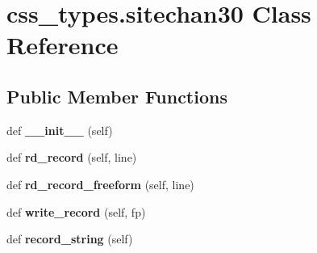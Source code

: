 \hypertarget{classcss__types_1_1sitechan30}{}\section{css\+\_\+types.\+sitechan30 Class Reference}
\label{classcss__types_1_1sitechan30}
\subsection*{Public Member Functions}
\begin{DoxyCompactItemize}
\item 
\hypertarget{classcss__types_1_1sitechan30_a282a0584cb243799c2d35a0ad6472b5b}{}def {\bfseries \+\_\+\+\_\+init\+\_\+\+\_\+} (self)\label{classcss__types_1_1sitechan30_a282a0584cb243799c2d35a0ad6472b5b}

\item 
\hypertarget{classcss__types_1_1sitechan30_abcb97cf4033ae1c433e7524b8701e3ac}{}def {\bfseries rd\+\_\+record} (self, line)\label{classcss__types_1_1sitechan30_abcb97cf4033ae1c433e7524b8701e3ac}

\item 
\hypertarget{classcss__types_1_1sitechan30_aabfcf51ff3c5c79edbe84471622db853}{}def {\bfseries rd\+\_\+record\+\_\+freeform} (self, line)\label{classcss__types_1_1sitechan30_aabfcf51ff3c5c79edbe84471622db853}

\item 
\hypertarget{classcss__types_1_1sitechan30_ad1e1a28b30a77f610f08faf1587ccda9}{}def {\bfseries write\+\_\+record} (self, fp)\label{classcss__types_1_1sitechan30_ad1e1a28b30a77f610f08faf1587ccda9}

\item 
\hypertarget{classcss__types_1_1sitechan30_aeb7985bdddc2c557bff44aa2b997427d}{}def {\bfseries record\+\_\+string} (self)\label{classcss__types_1_1sitechan30_aeb7985bdddc2c557bff44aa2b997427d}

\end{DoxyCompactItemize}
